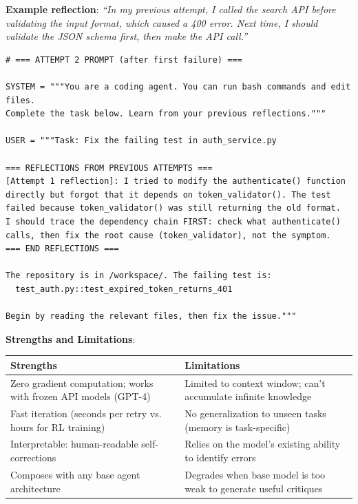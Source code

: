 \textbf{Example reflection}: \emph{``In my previous attempt, I called the search API before validating the input format, which caused a 400 error. Next time, I should validate the JSON schema first, then make the API call.''}

\begin{examplebox}
\begin{lstlisting}[style=pythonstyle]
# === ATTEMPT 2 PROMPT (after first failure) ===

SYSTEM = """You are a coding agent. You can run bash commands and edit files.
Complete the task below. Learn from your previous reflections."""

USER = """Task: Fix the failing test in auth_service.py

=== REFLECTIONS FROM PREVIOUS ATTEMPTS ===
[Attempt 1 reflection]: I tried to modify the authenticate() function
directly but forgot that it depends on token_validator(). The test
failed because token_validator() was still returning the old format.
I should trace the dependency chain FIRST: check what authenticate()
calls, then fix the root cause (token_validator), not the symptom.
=== END REFLECTIONS ===

The repository is in /workspace/. The failing test is:
  test_auth.py::test_expired_token_returns_401

Begin by reading the relevant files, then fix the issue."""
\end{lstlisting}
\end{examplebox}

\textbf{Strengths and Limitations}:

{\small
\begin{tabular}{@{}p{7.5cm}p{7.5cm}@{}}
\toprule
\textbf{Strengths} & \textbf{Limitations} \\
\midrule
Zero gradient computation; works with frozen API models (GPT-4) & Limited to context window; can’t accumulate infinite knowledge \\
Fast iteration (seconds per retry vs. hours for RL training) & No generalization to unseen tasks (memory is task-specific) \\
Interpretable: human-readable self-corrections & Relies on the model’s existing ability to identify errors \\
Composes with any base agent architecture & Degrades when base model is too weak to generate useful critiques \\
\bottomrule
\end{tabular}
}

